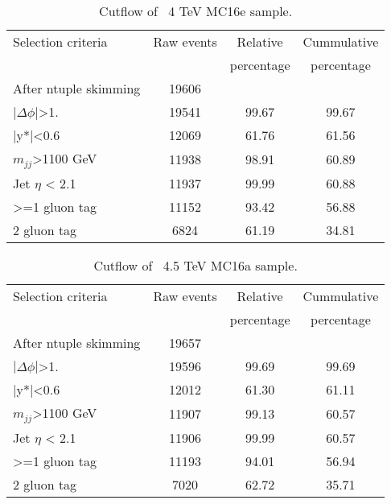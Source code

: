 \begin{table}[ht]
\begin{center}
\begin{tabular}{|l|c|c|c|}
\hline
Selection criteria & Raw events &  Relative & Cummulative \\
 & & percentage & percentage \\
\hline
After ntuple skimming & 19606 &  &  \\
$|\Delta\phi|$>1. & 19541 & 99.67 & 99.67 \\
|y*|<0.6 & 12069 & 61.76 & 61.56 \\
$m_{jj}$>1100 GeV & 11938 & 98.91 & 60.89 \\
Jet $\eta$ < 2.1 & 11937 & 99.99 & 60.88 \\
>=1 gluon tag & 11152 & 93.42 & 56.88 \\
2 gluon tag & 6824 & 61.19 & 34.81 \\
\hline
\end{tabular}
\end{center}
\caption{Cutflow of \Hprime\ 4 TeV MC16e sample.}
\end{table}

\begin{table}[ht]
\begin{center}
\begin{tabular}{|l|c|c|c|}
\hline
Selection criteria & Raw events &  Relative & Cummulative \\
 & & percentage & percentage \\
\hline
After ntuple skimming & 19657 &  &  \\
$|\Delta\phi|$>1. & 19596 & 99.69 & 99.69 \\
|y*|<0.6 & 12012 & 61.30 & 61.11 \\
$m_{jj}$>1100 GeV & 11907 & 99.13 & 60.57 \\
Jet $\eta$ < 2.1 & 11906 & 99.99 & 60.57 \\
>=1 gluon tag & 11193 & 94.01 & 56.94 \\
2 gluon tag & 7020 & 62.72 & 35.71 \\
\hline
\end{tabular}
\end{center}
\caption{Cutflow of \Hprime\ 4.5 TeV MC16a sample.}
\end{table}

